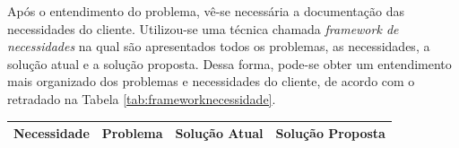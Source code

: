 Após o entendimento do problema, vê-se necessária a documentação das necessidades do cliente. Utilizou-se uma técnica chamada \textit{framework de necessidades} na qual são apresentados todos os problemas, as necessidades, a solução atual e a solução proposta. Dessa forma, pode-se obter um entendimento mais organizado dos problemas e necessidades do cliente, de acordo com o retradado na Tabela \ref{tab:frameworknecessidade}.

\begin{table}[H]
\centering
\begin{tabular}{|p{5cm}|p{3cm}|p{3cm}|p{5cm}|}

\hline
\textbf{Necessidade} &
\textbf{Problema} &
\textbf{Solução Atual} &
\textbf{Solução Proposta}
\\ \hline


\end{tabular}
\end{table}
